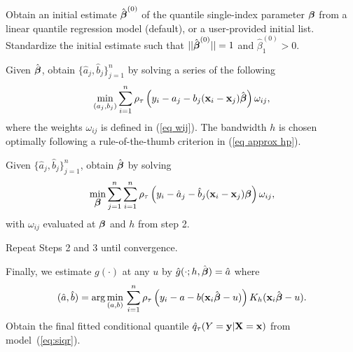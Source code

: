 \begin{algorithm}[H]  
	
	Obtain an initial estimate $\hat{\mbox{\boldmath$\beta$}}^{(0)}$ of the quantile single-index parameter $\mbox{\boldmath$\beta$}$ from a linear quantile regression model (default), or a user-provided initial list.
	Standardize the initial estimate such that $||{\hat {\mbox{\boldmath$\beta$}}}^{(0)}||=1$ and ${\hat {\beta}}^{(0)}_1>0.$ 
	
	Given $\hat {\mbox{\boldmath$\beta$}}$, obtain $\{{\hat a}_j, {\hat b}_j\}_{j=1}^n$ by solving a series of the following
		\begin{equation}\label{eq:step2}
		\min_{(a_j, b_j)}\sum_{i=1}^n\rho_\tau\left(y_i-a_j-b_j({\bf x}_i-{\bf x}_j){\hat{\mbox{\boldmath$\beta$}}}\right)\omega_{ij},
		\end{equation}
		where the weights $\omega_{ij}$ is defined in (\ref{eq wij}). The bandwidth $h$ is chosen optimally following a rule-of-the-thumb criterion in (\ref{eq approx hp}).
		
	Given  $\{{\hat a}_j, {\hat b}_j \}_{j=1}^n$, obtain ${\hat{\mbox{\boldmath$\beta$}}}$ by solving
		\begin{equation} 
		\min_{\mbox{\boldmath$\beta$}}\sum_{j=1}^n\sum_{i=1}^n\rho_\tau\left(y_i-{\hat a}_j-{\hat b}_j ({\bf x}_i-{\bf x}_j)\mbox{\boldmath$\beta$}\right)\omega_{ij}, \label{eq:step3}
		\end{equation}
		with $\omega_{ij}$ evaluated at ${\mbox{\boldmath$\beta$}}$ and $h$ from step 2.
		
	    Repeat Steps 2 and 3 until convergence.
	    
	    Finally, we estimate $g(\cdot)$ at any $u$ by $\hat{g}(\cdot;h, \hat{\mbox{\boldmath$\beta$}})=\hat{a}$ where
	    \begin{equation*}\label{eq final link}
	    (\hat{a},\hat{b})=\arg\min_{(a, b)}\,\sum_{i=1}^n\rho_\tau\left(y_i-a-b({\bf x}_i{\hat{\mbox{\boldmath$\beta$}}}-u)\right)K_h({\bf x}_i\hat{\mbox{\boldmath$\beta$}}-u).
	    \end{equation*}
	    Obtain the final fitted conditional quantile $\hat{q}_{\tau}(Y ={\bf y} | {\bf X}={\bf x})$ from model~(\ref{eq:siqr}).
	
\end{algorithm}


